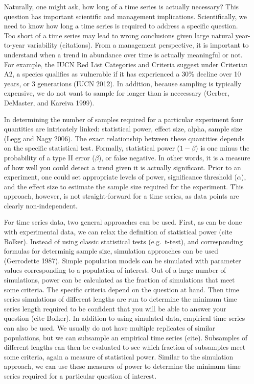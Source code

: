 \documentclass[12pt,]{article}
\begin{document}
Naturally, one might ask, how long of a time series is actually
necessary? This question has important scientific and management
implications. Scientifically, we need to know how long a time series is
required to address a specific question. Too short of a time series may
lead to wrong conclusions given large natural year-to-year variability
(citations). From a management perspective, it is important to
understand when a trend in abundance over time is actually meaningful or
not. For example, the IUCN Red List Categories and Criteria suggest
under Criterian A2, a species qualifies as vulnerable if it has
experienced a 30\% decline over 10 years, or 3 generations (IUCN 2012).
In addition, because sampling is typically expensive, we do not want to
sample for longer than is neccessary (Gerber, DeMaster, and Kareiva
1999).

In determining the number of samples required for a particular
experiment four quantities are intricately linked: statistical power,
effect size, alpha, sample size (Legg and Nagy 2006). The exact
relationship between these quantities depends on the specific
statistical test. Formally, statistical power (\(1-\beta\)) is one minus
the probability of a type II error (\(\beta\)), or false negative. In
other words, it is a measure of how well you could detect a trend given
it is actually significant. Prior to an experiment, one could set
appropriate levels of power, significance threshold (\(\alpha\)), and
the effect size to estimate the sample size required for the experiment.
This approach, however, is not straight-forward for a time series, as
data points are clearly non-independent.

For time series data, two general approaches can be used. First, as can
be done with experimental data, we can relax the definition of
statistical power (cite Bolker). Instead of using classic statistical
tests (e.g.~t-test), and corresponding formulas for determinig sample
size, simulation approaches can be used (Gerrodette 1987). Simple
population models can be simulated with parameter values corresponding
to a population of interest. Out of a large number of simulations, power
can be calculated as the fraction of simulations that meet some
criteria. The specific criteria depend on the question at hand. Then
time series simulations of different lengths are run to determine the
minimum time series length required to be confident that you will be
able to answer your question (cite Bolker). In addition to using
simulated data, empirical time series can also be used. We usually do
not have multiple replicates of similar populations, but we can
subsample an empirical time series (cite). Subsamples of different
lengths can then be evaluated to see which fraction of subsamples meet
some criteria, again a measure of statistical power. Similar to the
simulation approach, we can use these measures of power to determine the
minimum time series required for a particular question of interest.
\end{document}
